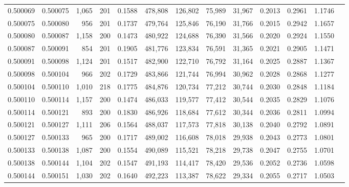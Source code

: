 \begin{tabular}{rrrrrrrrrrrrr}
0.500069 & 0.500075 & 1,065 & 201 &                                     0.1588 & 478,808 & 126,802 &  75,989 &  31,967 & 0.2013 & 0.2961 & 1.1746 \\
0.500075 & 0.500080 &   956 & 201 &                                     0.1737 & 479,764 & 125,846 &  76,190 &  31,766 & 0.2015 & 0.2942 & 1.1657 \\
0.500080 & 0.500087 & 1,158 & 200 &                                     0.1473 & 480,922 & 124,688 &  76,390 &  31,566 & 0.2020 & 0.2924 & 1.1550 \\
0.500087 & 0.500091 &   854 & 201 &                                     0.1905 & 481,776 & 123,834 &  76,591 &  31,365 & 0.2021 & 0.2905 & 1.1471 \\
0.500091 & 0.500098 & 1,124 & 201 &                                     0.1517 & 482,900 & 122,710 &  76,792 &  31,164 & 0.2025 & 0.2887 & 1.1367 \\
0.500098 & 0.500104 &   966 & 202 &                                     0.1729 & 483,866 & 121,744 &  76,994 &  30,962 & 0.2028 & 0.2868 & 1.1277 \\
0.500104 & 0.500110 & 1,010 & 218 &                                     0.1775 & 484,876 & 120,734 &  77,212 &  30,744 & 0.2030 & 0.2848 & 1.1184 \\
0.500110 & 0.500114 & 1,157 & 200 &                                     0.1474 & 486,033 & 119,577 &  77,412 &  30,544 & 0.2035 & 0.2829 & 1.1076 \\
0.500114 & 0.500121 &   893 & 200 &                                     0.1830 & 486,926 & 118,684 &  77,612 &  30,344 & 0.2036 & 0.2811 & 1.0994 \\
0.500121 & 0.500127 & 1,111 & 206 &                                     0.1564 & 488,037 & 117,573 &  77,818 &  30,138 & 0.2040 & 0.2792 & 1.0891 \\
0.500127 & 0.500133 &   965 & 200 &                                     0.1717 & 489,002 & 116,608 &  78,018 &  29,938 & 0.2043 & 0.2773 & 1.0801 \\
0.500133 & 0.500138 & 1,087 & 200 &                                     0.1554 & 490,089 & 115,521 &  78,218 &  29,738 & 0.2047 & 0.2755 & 1.0701 \\
0.500138 & 0.500144 & 1,104 & 202 &                                     0.1547 & 491,193 & 114,417 &  78,420 &  29,536 & 0.2052 & 0.2736 & 1.0598 \\
0.500144 & 0.500151 & 1,030 & 202 &                                     0.1640 & 492,223 & 113,387 &  78,622 &  29,334 & 0.2055 & 0.2717 & 1.0503 \\

\end{tabular}
